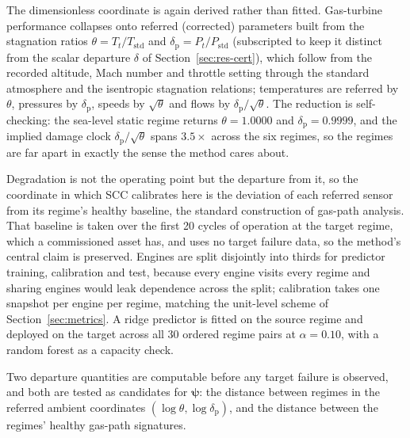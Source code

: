 The dimensionless coordinate is again derived rather than fitted. Gas-turbine performance collapses
onto referred (corrected) parameters built from the stagnation ratios $\theta=T_t/T_{\mathrm{std}}$
and $\delta_{\mathrm{p}}=P_t/P_{\mathrm{std}}$ (subscripted to keep it distinct from the scalar
departure $\delta$ of Section~\ref{sec:res-cert}), which follow from the recorded altitude, Mach
number and throttle setting through the standard atmosphere and the isentropic stagnation
relations; temperatures are referred by $\theta$, pressures by $\delta_{\mathrm{p}}$, speeds by
$\sqrt{\theta}$ and flows by $\delta_{\mathrm{p}}/\sqrt{\theta}$. The reduction is self-checking:
the sea-level
static regime returns $\theta=1.0000$ and $\delta_{\mathrm{p}}=0.9999$, and the implied damage clock
$\delta_{\mathrm{p}}/\sqrt{\theta}$ spans $3.5\times$ across the six regimes, so the regimes are far
apart in exactly the sense the method cares about.

Degradation is not the operating point but the departure from it, so the coordinate in which SCC
calibrates here is the deviation of each referred sensor from its regime's healthy baseline, the
standard construction of gas-path analysis. That baseline is taken over the first 20 cycles of
operation at the target regime, which a commissioned asset has, and uses no target failure data, so
the method's central claim is preserved. Engines are split disjointly into thirds for predictor
training, calibration and test, because every engine visits every regime and sharing engines would
leak dependence across the split; calibration takes one snapshot per engine per regime, matching the
unit-level scheme of Section~\ref{sec:metrics}. A ridge predictor is fitted on the source regime and
deployed on the target across all 30 ordered regime pairs at $\alpha=0.10$, with a random forest as
a capacity check.

Two departure quantities are computable before any target failure is observed, and both are tested
as candidates for $\boldsymbol\psi$: the distance between regimes in the referred ambient
coordinates $(\log\theta,\log\delta_{\mathrm{p}})$, and the distance between the regimes' healthy
gas-path signatures.
